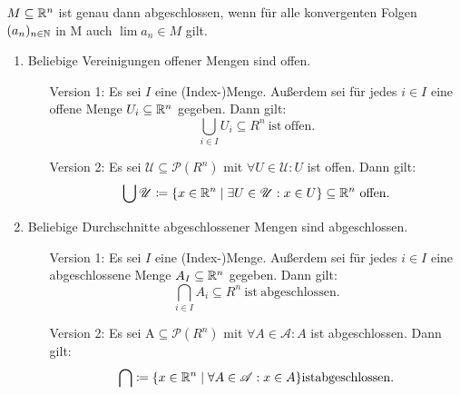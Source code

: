 \begin{lemma}
    \(M\subseteq \mathbb{R}^n\) ist genau dann abgeschlossen, wenn für alle konvergenten Folgen \((a_n)_{n\in \mathbb{N}}\) in M auch \(\lim a_n \in M\) gilt.
\end{lemma}
\begin{satz}
    \begin{enumerate}
        \item Beliebige Vereinigungen offener Mengen sind offen.
        \begin{itemize}
            \item[Version 1:] Es sei $I$ eine (Index-)Menge. Außerdem sei für jedes $i\in I$ eine offene Menge $U_i\subseteq \mathbb{R}^n$ gegeben. Dann gilt:
            \[
                \bigcup_{i\in I} U_i \subseteq R^n \mathrm{\ ist\ offen.}
            \]
            \item[Version 2:] Es sei $\mathscr{U}\subseteq\mathscr{P}(R^n)$ mit \(\forall U\in \mathscr{U}: U\) ist offen. Dann gilt:
            \[
                \bigcup \mathscr{U} \coloneqq \{x\in\mathbb{R}^n \mid \exists U\in\mathscr{U}: x\in U\}\subseteq \mathbb{R}^n \mathrm{\ offen.}
            \]
        \end{itemize}
        \item Beliebige Durchschnitte abgeschlossener Mengen sind abgeschlossen.
        \begin{itemize}
            \item[Version 1:] Es sei $I$ eine (Index-)Menge. Außerdem sei für jedes $i\in I$ eine abgeschlossene Menge $A_I\subseteq \mathbb{R}^n$ gegeben. Dann gilt:
            \[
                \bigcap_{i\in I} A_i \subseteq R^n \mathrm{\ ist\ abgeschlossen.}
            \]
            \item[Version 2:] Es sei $\mathrm{A}\subseteq\mathscr{P}(R^n)$ mit \(\forall A\in \mathscr{A}: A\) ist abgeschlossen. Dann gilt:
            \[
                \bigcap \coloneqq \{x\in \mathbb{R}^n \mid \forall A\in\mathscr{A}: x\in A\} \mathrm{ist abgeschlossen.}
            \]
        \end{itemize}

    \end{enumerate}
\end{satz}
